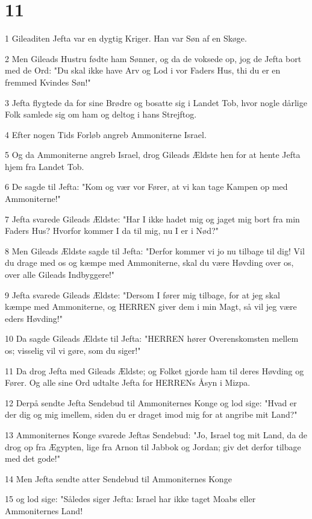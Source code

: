 \chapter{11}

\par 1 Gileaditen Jefta var en dygtig Kriger. Han var Søn af en Skøge.
\par 2 Men Gileads Hustru fødte ham Sønner, og da de voksede op, jog de Jefta bort med de Ord: "Du skal ikke have Arv og Lod i vor Faders Hus, thi du er en fremmed Kvindes Søn!"
\par 3 Jefta flygtede da for sine Brødre og bosatte sig i Landet Tob, hvor nogle dårlige Folk samlede sig om ham og deltog i hans Strejftog.
\par 4 Efter nogen Tids Forløb angreb Ammoniterne Israel.
\par 5 Og da Ammoniterne angreb Israel, drog Gileads Ældste hen for at hente Jefta hjem fra Landet Tob.
\par 6 De sagde til Jefta: "Kom og vær vor Fører, at vi kan tage Kampen op med Ammoniterne!"
\par 7 Jefta svarede Gileads Ældste: "Har I ikke hadet mig og jaget mig bort fra min Faders Hus? Hvorfor kommer I da til mig, nu I er i Nød?"
\par 8 Men Gileads Ældste sagde til Jefta: "Derfor kommer vi jo nu tilbage til dig! Vil du drage med os og kæmpe med Ammoniterne, skal du være Høvding over os, over alle Gileads Indbyggere!"
\par 9 Jefta svarede Gileads Ældste: "Dersom I fører mig tilbage, for at jeg skal kæmpe med Ammoniterne, og HERREN giver dem i min Magt, så vil jeg være eders Høvding!"
\par 10 Da sagde Gileads Ældste til Jefta: "HERREN hører Overenskomsten mellem os; visselig vil vi gøre, som du siger!"
\par 11 Da drog Jefta med Gileads Ældste; og Folket gjorde ham til deres Høvding og Fører. Og alle sine Ord udtalte Jefta for HERRENs Åsyn i Mizpa.
\par 12 Derpå sendte Jefta Sendebud til Ammoniternes Konge og lod sige: "Hvad er der dig og mig imellem, siden du er draget imod mig for at angribe mit Land?"
\par 13 Ammoniternes Konge svarede Jeftas Sendebud: "Jo, Israel tog mit Land, da de drog op fra Ægypten, lige fra Arnon til Jabbok og Jordan; giv det derfor tilbage med det gode!"
\par 14 Men Jefta sendte atter Sendebud til Ammoniternes Konge
\par 15 og lod sige: "Således siger Jefta: Israel har ikke taget Moabs eller Ammoniternes Land!
